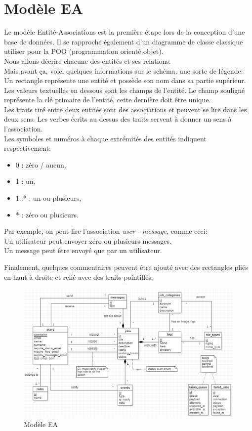 \documentclass[
    iai, %
    il, %
]{heig-tb}
\begin{document}
\section{Modèle EA}
Le modèle Entité-Associations est la première étape lors de la conception d'une base de données. Il se rapproche également d'un diagramme de classe classique utiliser pour la POO (programmation orienté objet).\\
Nous allons décrire chacune des entités et ses relations.\\
Mais avant ça, voici quelques informations sur le schéma, une sorte de légende:\\
Un rectangle représente une entité et possède son nom dans sa partie supérieur.\\
Les valeurs textuelles en dessous sont les champs de l'entité. Le champ souligné représente la clé primaire de l'entité, cette dernière doit être unique.\\
Les traits tiré entre deux entités sont des associations et peuvent se lire dans les deux sens. Les verbes écrits au dessus des traits servent à donner un sens à l'association.\\
Les symboles et numéros à chaque extrémités des entités indiquent respectivement:
\begin{itemize}
    \item 0 : zéro / aucun,
    \item 1 : un,
    \item 1..* : un ou plusieurs,
    \item * : zéro ou plusieurs.
\end{itemize}

Par exemple, on peut lire l'association \emph{user - message}, comme ceci:\\
Un utilisateur peut envoyer zéro ou plusieurs messages.\\
Un message peut être envoyé que par un utilisateur.

Finalement, quelques commentaires peuvent être ajouté avec des rectangles pliés en haut à droite et relié avec des traits pointillés.

\begin{center}
    \begin{figure}
        \includegraphics[width=\textwidth]{./assets/figures/ea.png}
        \caption{Modèle EA \label{ea}}
    \end{figure}
\end{center}
\end{document}
